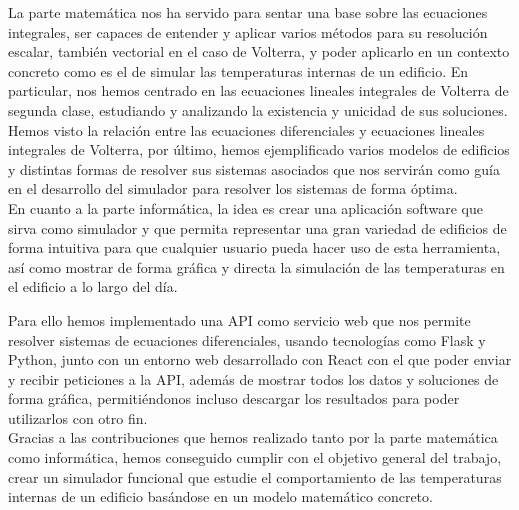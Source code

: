 La parte matemática nos ha servido para sentar una base sobre las ecuaciones integrales, ser capaces de entender y aplicar varios métodos para su resolución escalar, también vectorial en el caso de Volterra, y poder aplicarlo en un contexto concreto como es el de simular las temperaturas internas de un edificio. En particular, nos hemos centrado en las ecuaciones lineales integrales de Volterra de segunda clase, estudiando y analizando la existencia y unicidad de sus soluciones. Hemos visto la relación entre las ecuaciones diferenciales y ecuaciones lineales integrales de Volterra, por último, hemos ejemplificado varios modelos de edificios y distintas formas de resolver sus sistemas asociados que nos servirán como guía en el desarrollo del simulador para resolver los sistemas de forma óptima.\\

En cuanto a la parte informática, la idea es crear una aplicación software que sirva como simulador y que permita representar una gran variedad de edificios de forma intuitiva para que cualquier usuario pueda hacer uso de esta herramienta, así como mostrar de forma gráfica y directa la simulación de las temperaturas en el edificio a lo largo del día.

Para ello hemos implementado una API como servicio web que nos permite resolver sistemas de ecuaciones diferenciales, usando tecnologías como Flask y Python, junto con un entorno web desarrollado con React con el que poder enviar y recibir peticiones a la API, además de mostrar todos los datos y soluciones de forma gráfica, permitiéndonos incluso descargar los resultados para poder utilizarlos con otro fin.\\

Gracias a las contribuciones que hemos realizado tanto por la parte matemática como informática, hemos conseguido cumplir con el objetivo general del trabajo, crear un simulador funcional que estudie el comportamiento de las temperaturas internas de un edificio basándose en un modelo matemático concreto.
